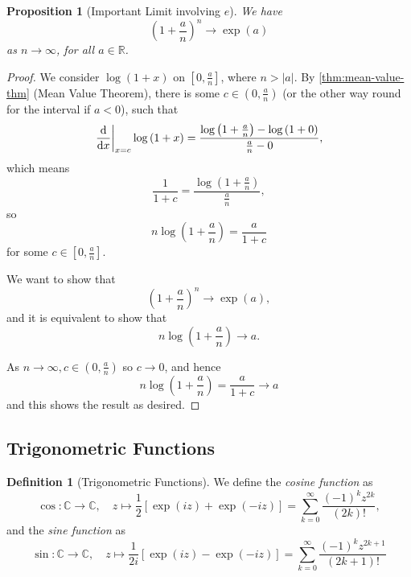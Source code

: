 \documentclass[11pt]{article}
\numberwithin{equation}{section}
\newtheorem{proposition}[theorem]{Proposition}
\theoremstyle{definition}
\newtheorem{definition}[theorem]{Definition}
\theoremstyle{remark}
\newcommand{\pqty}[1]{\left(#1\right)}
\newcommand{\bqty}[1]{\left[#1\right]}
\newcommand{\abs}[1]{\left|#1\right|}
\newcommand{\flatfrac}[2]{\frac{#1}{#2}}
\newcommand{\ccintv}[2]{[#1,#2]}
\newcommand{\oointv}[2]{(#1,#2)}
\newcommand{\function}[5]{#1:#2\to #3,\quad #4\mapsto #5}
\newcommand{\RR}{\mathbb R}
\newcommand{\CC}{\mathbb C}
\newcommand{\rightbar}[1]{\left.#1\right|}
\begin{document}
\begin{proposition}[Important Limit involving \(e\)]\label{analysis-unit-0228}
    We have
    \[
        \pqty{1 + \frac{a}{n}}^n \to \exp \pqty{a}
    \]
    as \(n \to \infty\), for all \(a \in \RR\).
\end{proposition}

\begin{proof}
    We consider \(\log\pqty{1 + x}\) on \(\ccintv{0}{\flatfrac{a}{n}}\), where \(n > \abs{a}\). By \autoref{thm:mean-value-thm} (Mean Value Theorem), there is some \(c \in \oointv{0}{\flatfrac{a}{n}}\) (or the other way round for the interval if \(a < 0\)), such that
    \[
        \rightbar{\dv{x}}_{x = c} \log \pqty{1 + x} = \frac{\log\pqty{1 + \flatfrac{a}{n}} - \log\pqty{1 + 0}}{\flatfrac{a}{n} - 0},
    \]
    which means
    \[
        \frac{1}{1 + c} = \frac{\log \pqty{1 + \flatfrac{a}{n}}}{\flatfrac{a}{n}},
    \]
    so
    \[
        n \log \pqty{1 + \frac{a}{n}} = \frac{a}{1 + c}
    \]
    for some \(c \in \ccintv{0}{\flatfrac{a}{n}}\).

    We want to show that
    \[
        \pqty{1 + \frac{a}{n}}^n \to \exp\pqty{a},
    \]
    and it is equivalent to show that
    \[
        n \log\pqty{1 + \frac{a}{n}} \to a.
    \]

    As \(n \to \infty, c \in \oointv{0}{\flatfrac{a}{n}}\) so \(c \to 0\), and hence
    \[
        n \log\pqty{1 + \frac{a}{n}} = \frac{a}{1 + c} \to a
    \]
    and this shows the result as desired.
\end{proof}

\subsection{Trigonometric Functions}

\begin{definition}[Trigonometric Functions]\label{analysis-unit-0229}
    \label{def:trigonometric-functions}%
    We define the \emph{cosine function} as
    \[
        \function{\cos}{\CC}{\CC}{z}{\frac{1}{2} \bqty{\exp \pqty{iz} + \exp \pqty{- iz}} = \sum_{k = 0}^{\infty} \frac{\pqty{-1}^k z^{2k}}{\pqty{2k}!},}
    \]
    and the \emph{sine function} as
    \[
        \function{\sin}{\CC}{\CC}{z}{\frac{1}{2i} \bqty{\exp \pqty{iz} - \exp \pqty{- iz}} = \sum_{k = 0}^{\infty} \frac{\pqty{-1}^k z^{2k + 1}}{\pqty{2k + 1}!}}
    \]
\end{definition}
\end{document}
